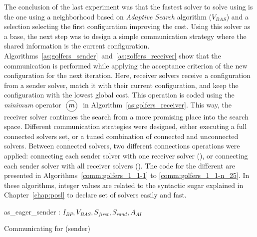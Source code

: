 \separation

The conclusion of the last experiment was that the fastest solver to solve \SGP{} using \posl{} is the one using a neighborhood \om{} based on {\it Adaptive Search} algorithm ($V_{BAS}$) and a selection \om{} selecting the first configuration improving the cost. Using this solver as a base, the next step was to design a simple communication strategy where the shared information is the current configuration. Algorithms~\ref{as:golfers_sender}~and~\ref{as:golfers_receiver} show that the communication is performed while applying the acceptance criterion of the new configuration for the next iteration. Here, receiver solvers receive a configuration from a sender solver, match it with their current configuration, and keep the configuration with the lowest global cost. This operation is coded using the \textit{minimum} operator $\poslop{m}$ in Algorithm~\ref{as:golfers_receiver}. This way, the receiver solver continues the search from a more promising place into the search space. Different communication strategies were designed, either executing a full connected solvers set, or a tuned combination of connected and unconnected solvers. Between connected solvers, two different connections operations were applied: connecting each sender solver with one receiver solver (\oneTone), or connecting each sender solver with all receiver solvers (\oneTn). The code for the different \commstrs{} are presented in Algorithms~\ref{comm:golfers_1_1-1} to \ref{comm:golfers_1_1-n_25}. In these algorithms, integer values are related to the syntactic sugar explained in Chapter~\ref{chap:posl} to declare set of solvers easily and fast.

\begin{algorithm}[t]
\dontprintsemicolon
\SetNoline
{}
   as\_eager\_sender\;
\algoindent {} : $I_{BP}, V_{BAS}, S_{first}, S_{rand}, A_{AI}$ \;
\caption{Communicating \as{} for \SGP{} (sender)}\label{as:golfers_sender}
\end{algorithm}

